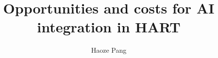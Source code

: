 \documentclass{scrartcl}
\begin{document}
\title{Opportunities and costs for AI integration in HART}
\author{Haoze Pang}
\maketitle

\end{document}
